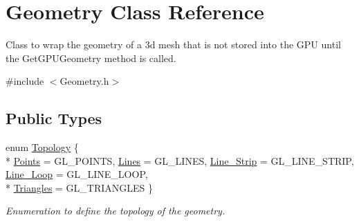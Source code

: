 \hypertarget{class_geometry}{\section{Geometry Class Reference}
\label{class_geometry}
}


Class to wrap the geometry of a 3d mesh that is not stored into the G\+P\+U until the Get\+G\+P\+U\+Geometry method is called.  




{\ttfamily \#include $<$Geometry.\+h$>$}

\subsection*{Public Types}
\begin{DoxyCompactItemize}
\item 
enum \hyperlink{class_geometry_af0136a3b268286ee5921cc6af5239293}{Topology} \{ \\*
\hyperlink{class_geometry_af0136a3b268286ee5921cc6af5239293a2dc58614ae2624eb5e9ef19ef0b2e3f7}{Points} = G\+L\+\_\+\+P\+O\+I\+N\+T\+S, 
\hyperlink{class_geometry_af0136a3b268286ee5921cc6af5239293a103668f674a21b448be2eb0ef0ee30df}{Lines} = G\+L\+\_\+\+L\+I\+N\+E\+S, 
\hyperlink{class_geometry_af0136a3b268286ee5921cc6af5239293a8f190b5e0cb67675c38b9eacfc609953}{Line\+\_\+\+Strip} = G\+L\+\_\+\+L\+I\+N\+E\+\_\+\+S\+T\+R\+I\+P, 
\hyperlink{class_geometry_af0136a3b268286ee5921cc6af5239293a1f5e0519d79112ee2ffe518e2f6371b6}{Line\+\_\+\+Loop} = G\+L\+\_\+\+L\+I\+N\+E\+\_\+\+L\+O\+O\+P, 
\\*
\hyperlink{class_geometry_af0136a3b268286ee5921cc6af5239293a892a36aa94ee995c59c11210ac98f088}{Triangles} = G\+L\+\_\+\+T\+R\+I\+A\+N\+G\+L\+E\+S
 \}
\begin{DoxyCompactList}\small\item\em Enumeration to define the topology of the geometry. \end{DoxyCompactList}\end{DoxyCompactItemize}
